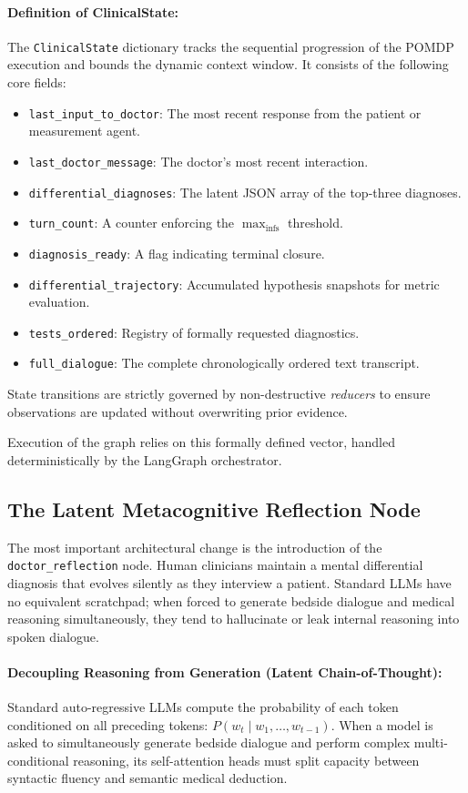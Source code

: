 \paragraph{Definition of ClinicalState:}
The \texttt{ClinicalState} dictionary tracks the sequential progression of the POMDP execution and bounds the dynamic context window. It consists of the following core fields:
\begin{itemize}
    \item \texttt{last\_input\_to\_doctor}: The most recent response from the patient or measurement agent.
    \item \texttt{last\_doctor\_message}: The doctor's most recent interaction.
    \item \texttt{differential\_diagnoses}: The latent JSON array of the top-three diagnoses.
    \item \texttt{turn\_count}: A counter enforcing the $\max_{\text{infs}}$ threshold.
    \item \texttt{diagnosis\_ready}: A flag indicating terminal closure.
    \item \texttt{differential\_trajectory}: Accumulated hypothesis snapshots for metric evaluation.
    \item \texttt{tests\_ordered}: Registry of formally requested diagnostics.
    \item \texttt{full\_dialogue}: The complete chronologically ordered text transcript.
\end{itemize}
State transitions are strictly governed by non-destructive \textit{reducers} to ensure observations are updated without overwriting prior evidence.

Execution of the graph relies on this formally defined vector, handled deterministically by the LangGraph orchestrator.

\subsection{The Latent Metacognitive Reflection Node}

The most important architectural change is the introduction of the \texttt{doctor\_reflection} node. Human clinicians maintain a mental differential diagnosis that evolves silently as they interview a patient. Standard LLMs have no equivalent scratchpad; when forced to generate bedside dialogue and medical reasoning simultaneously, they tend to hallucinate or leak internal reasoning into spoken dialogue.

\paragraph{Decoupling Reasoning from Generation (Latent Chain-of-Thought):}
Standard auto-regressive LLMs compute the probability of each token conditioned on all preceding tokens: $P(w_t \mid w_1, \ldots, w_{t-1})$. When a model is asked to simultaneously generate bedside dialogue and perform complex multi-conditional reasoning, its self-attention heads must split capacity between syntactic fluency and semantic medical deduction. 


